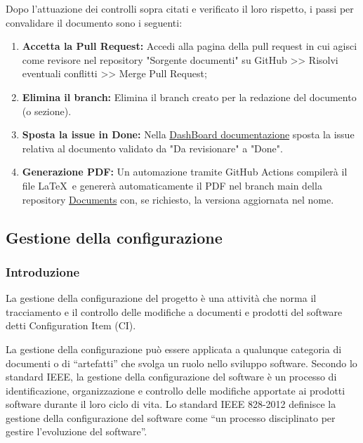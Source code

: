 \documentclass{article}
\begin{document}
Dopo l'attuazione dei controlli sopra citati e verificato il loro rispetto, i passi per convalidare il documento sono i seguenti:
\begin{enumerate}
    \item \textbf{Accetta la Pull Request:} Accedi alla pagina della pull request in cui agisci come revisore nel repository "Sorgente documenti" su GitHub >> Risolvi eventuali conflitti >> Merge Pull Request;
    \item \textbf{Elimina il branch: } Elimina il branch creato per la redazione del documento (o sezione).
    \item \textbf{Sposta la issue in Done:} Nella \href{https://github.com/orgs/ByteOps-swe/projects/1/views/1}{DashBoard documentazione} sposta la issue relativa al documento validato da "Da revisionare" a "Done".
    \item \textbf{Generazione PDF:} Un automazione tramite GitHub Actions compilerà il file   \LaTeX\ e genererà automaticamente il PDF nel branch main della repository \href{https://github.com/ByteOps-swe/Documents}{Documents} con, se richiesto, la versiona aggiornata nel nome.
\end{enumerate}
\subsection{Gestione della configurazione}
\subsubsection{Introduzione}
La gestione della configurazione del progetto è una attività che norma il tracciamento e il controllo delle modifiche a documenti e prodotti del software detti Configuration Item (CI).

La gestione della configurazione può essere applicata a qualunque categoria di documenti o di “artefatti” che svolga un ruolo nello sviluppo software.
Secondo lo standard IEEE, la gestione della configurazione del software è un processo di identificazione, organizzazione e controllo delle modifiche apportate ai prodotti software durante il loro ciclo di vita.
Lo standard IEEE 828-2012 definisce la gestione della configurazione del software come “un processo disciplinato per gestire l’evoluzione del software”.
\end{document}
